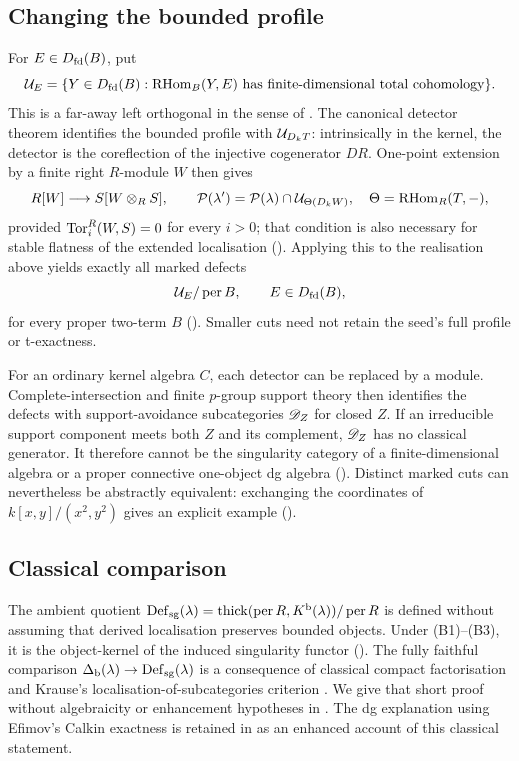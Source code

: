 \documentclass[11pt]{amsart}
\begin{document}
\subsection*{Changing the bounded profile}
For \(E\in D_{\mathrm{fd}}(B)\), put
\[
 \mathcal U_E=\{Y\in D_{\mathrm{fd}}(B):\operatorname{RHom}_B(Y,E)\text{ has finite-dimensional total cohomology}\}.
\]
This is a far-away left orthogonal in the sense of \cite{KostasPsaroudakisVitoria25}. The canonical detector theorem identifies the bounded profile with \(\mathcal U_{D_kT}\): intrinsically in the kernel, the detector is the coreflection of the injective cogenerator \(DR\). One-point extension by a finite right \(R\)-module \(W\) then gives
\[
 R[W]\longrightarrow S[W\otimes_RS],\qquad
 \mathcal P(\lambda')=\mathcal P(\lambda)\cap\mathcal U_{\Theta(D_kW)},
 \quad\Theta=\operatorname{RHom}_R(T,-),
\]
provided \(\operatorname{Tor}_i^R(W,S)=0\) for every \(i>0\); that condition is also necessary for stable flatness of the extended localisation (). Applying this to the realisation above yields exactly all marked defects
\[
 \mathcal U_E/\operatorname{per} B,\qquad E\in D_{\mathrm{fd}}(B),
\]
for every proper two-term \(B\) (). Smaller cuts need not retain the seed's full profile or t-exactness.

For an ordinary kernel algebra \(C\), each detector can be replaced by a module. Complete-intersection and finite \(p\)-group support theory then identifies the defects with support-avoidance subcategories \(\mathscr D_Z\) for closed \(Z\). If an irreducible support component meets both \(Z\) and its complement, \(\mathscr D_Z\) has no classical generator. It therefore cannot be the singularity category of a finite-dimensional algebra or a proper connective one-object dg algebra (). Distinct marked cuts can nevertheless be abstractly equivalent: exchanging the coordinates of \(k[x,y]/(x^2,y^2)\) gives an explicit example ().

\subsection*{Classical comparison}
The ambient quotient \(\operatorname{Def}_{\mathrm{sg}}(\lambda)=\operatorname{thick}(\operatorname{per} R,K^{\mathrm b}(\lambda))/\operatorname{per} R\) is defined without assuming that derived localisation preserves bounded objects. Under \textup{(B1)--(B3)}, it is the object-kernel of the induced singularity functor (). The fully faithful comparison \(\Delta_{\mathrm b}(\lambda)\to\operatorname{Def}_{\mathrm{sg}}(\lambda)\) is a consequence of classical compact factorisation and Krause's localisation-of-subcategories criterion \cite[Lemma~4.7.1(1), Theorem~7.2.1(1)]{Krause10}. We give that short proof without algebraicity or enhancement hypotheses in . The dg explanation using Efimov's Calkin exactness is retained in  as an enhanced account of this classical statement.
\end{document}
